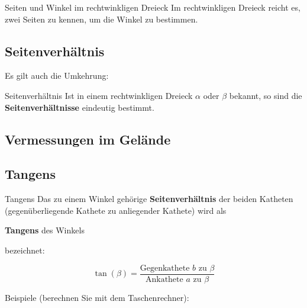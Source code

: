 \begin{gesetz}{Seiten und Winkel im rechtwinkligen Dreieck}{}
Im rechtwinkligen Dreieck reicht es, zwei Seiten zu kennen, um die
Winkel zu bestimmen.
\end{gesetz}


\subsection{Seitenverhältnis}
Es gilt auch die Umkehrung:
\begin{gesetz}{Seitenverhältnis}{}
Ist in einem rechtwinkligen Dreieck $\alpha$ oder $\beta$ bekannt, so
sind die \textbf{Seitenverhältnisse} eindeutig bestimmt.
\end{gesetz}
\newpage

\subsection{Vermessungen im Gelände}





\newpage
\subsection{Tangens}

\begin{definition}{Tangens}{}
Das zu einem Winkel gehörige \textbf{Seitenverhältnis} der beiden
Katheten (gegenüberliegende Kathete zu anliegender Kathete) wird als

\begin{center}\textbf{Tangens} des Winkels\end{center}
  bezeichnet:

    $$\tan(\beta) = \frac{\text{Gegenkathete } b \text{ zu }
    \beta}{\text{Ankathete } a \text{ zu } \beta}$$
\end{definition}

Beispiele (berechnen Sie mit dem Taschenrechner):

